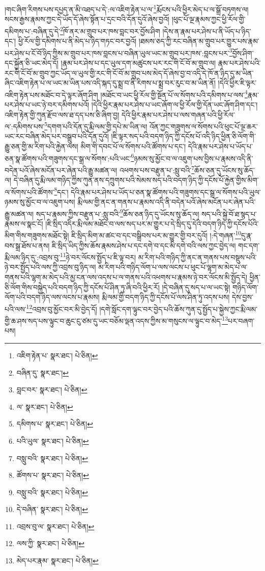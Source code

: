 །གང་ཞིག་རིགས་པས་དཔྱད་ན་མི་འཐད་པ་དེ་:ལ་འཇིག་རྟེན་པ་ལ་\footnote{འཇིག་རྟེན་པ་  སྣར་ཐང་།  པེ་ཅིན། }རྨོངས་པའི་ཕྱིར་མེད་པ་ལ་སྒྲོ་བཏགས་ལ། སངས་རྒྱས་རྣམས་ཀྱང་དེ་ཡོད་དོ་ཞེས་སྟོན་པ་དྲང་བའི་དོན་དུའོ་ཞེས་བྱའོ། །ཕུང་པོ་ལྔ་རྣམས་ཀྱང་ཕྱི་རོལ་གྱི་དམིགས་པ་:བཞིན་དུ་དེ་\footnote{བཞིན་དུ་  སྣར་ཐང་། }ཁོ་ནར་མ་གྲུབ་པར་ཁས་བླང་བར་བྱོས་ཤིག །དེས་ན་རྣམ་པར་ཤེས་པ་ནི་ཡོད་པ་ཉིད་དང་། ཕྱི་རོལ་གྱི་དམིགས་པ་ནི་མེད་པ་ཉིད་གཏང་བར་བྱའོ། །ཐམས་ཅད་ཀྱི་རང་བཞིན་མ་གྲུབ་པར་གྱུར་པས་རྣམ་པར་ཤེས་པ་ངོ་བོ་ཉིད་ཀྱིས་མ་གྲུབ་པར་ཁས་བླངས་པ་བཞིན་ཡུལ་ཡང་མ་གྲུབ་པར་ཁས་:བླངས་པར་\footnote{བླང་བར་  སྣར་ཐང་།  པེ་ཅིན། }བྱོས་ཤིག་དང་སྐྱོན་ཅི་ཡང་མེད་དོ། །རྣམ་པར་ཤེས་པ་དང་ཡུལ་དག་མཚུངས་པར་རང་གི་ངོ་བོ་མ་གྲུབ་ལ། རྣམ་པར་ཤེས་པའི་རང་གི་ངོ་བོ་མ་གྲུབ་ཀྱང་ཡོད་ལ་ཡུལ་གྱི་རང་གི་ངོ་བོ་མ་གྲུབ་པས་མེད་དོ་ཞེས་བྱ་བ་འདི་དེ་ཁོ་ན་ཉིད་དུ་མ་ཡིན་ཞིང་འཇིག་རྟེན་པ་ལ་ཡང་མ་ཡིན་པས་འདི་སྐད་དུ་སྨྲ་བ་ནི་རིགས་པ་སྨྲ་བར་རུང་བ་མ་ཡིན་ནོ། །དེའི་ཕྱིར་ཇི་ལྟར་འཇིག་རྟེན་པས་མཐོང་བ་དེ་ལྟར་ཞོག་ཤིག །མཐོང་བ་ཡང་ཕྱི་རོལ་གྱི་སྔོན་པོ་ལ་སོགས་པའི་དམིགས་པ་ལས་\footnote{ལ་  སྣར་ཐང་།  པེ་ཅིན། }རྣམ་པར་ཤེས་པ་ཡང་ཉེ་བར་དམིགས་པའོ། །དེའི་ཕྱིར་རྣམ་པར་ཤེས་པ་ཡང་ཞོག་ལ་ཕྱི་རོལ་གྱི་དོན་ཡང་ཞོག་ཤིག་དང་། འཇིག་རྟེན་གྱི་ཀུན་རྫོབ་ལས་ཐ་དད་པས་ཅི་ཞིག་བྱ། དེའི་ཕྱིར་རྣམ་པར་ཤེས་པ་ལས་གཞན་པའི་ཕྱི་རོལ་ལ་:དམིགས་པས་\footnote{དམིགས་པ་  སྣར་ཐང་།  པེ་ཅིན། }དགག་པའི་དོན་དུ་རྨི་ལམ་གྱི་དཔེ་མ་ཡིན་ལ། འོན་ཀྱང་གཟུགས་ལ་སོགས་པའི་ཕུང་པོ་ལྔ་ཆར་ཡང་རང་བཞིན་མེད་པར་བསྒྲུབ་པའི་དོན་དུའོ། །ཇི་ལྟར་སད་པའི་བདག་ཉིད་ཀྱི་དངོས་པོ་འདི་ཉིད་ཕྱིན་ཅི་ལོག་གི་རྒྱུ་ཅན་གྱི་མ་རིག་པའི་རྐྱེན་ལས། མིག་གི་དབང་པོ་ལ་སོགས་པའི་ཚོགས་པ་དང་། དེའི་རྣམ་པར་ཤེས་པ་ཡོད་པ་ཅན་སྣ་ཚོགས་པའི་གཟུགས་དང་སྒྲ་ལ་སོགས་:པའི་ཡང་\footnote{པའི་ཡུལ་  སྣར་ཐང་།  པེ་ཅིན། }ཉམས་སུ་མྱོང་བ་ལ་འཇུག་པས་བྱིས་པ་རྣམས་འདི་ནི་བདེན་པའོ་ཞེས་མངོན་པར་ཞེན་པའི་རྒྱུ་མཚན་ལ། འཕགས་པས་བརྫུན་པ་:སླུ་བའི་\footnote{བསླུ་བའི་  སྣར་ཐང་།  པེ་ཅིན། }ཆོས་ཅན་དུ་ཡོངས་སུ་ཆོད་ལ། དེ་བཞིན་དུ་རྨི་ལམ་གཉིད་ཀྱིས་ཀུན་ནས་དཀྲུགས་པའི་སེམས་སད་པའི་བདག་ཉིད་ཀྱི་དངོས་པོ་རྐྱེན་གྱིས་མིག་ལ་སོགས་པའི་ཚོགས་\footnote{ཚོགས་པ་  སྣར་ཐང་།  པེ་ཅིན། }དང་། དེའི་རྣམ་པར་ཤེས་པ་ཡོད་པ་ཅན་སྣ་ཚོགས་པའི་གཟུགས་དང་སྒྲ་ལ་སོགས་པའི་ཡུལ་ཉམས་སུ་མྱོང་བ་ལ་འཇུག་པས། རྨི་ལམ་གྱི་ནང་ན་གནས་པ་རྣམས་འདི་ནི་བདེན་པའོ་ཞེས་མངོན་པར་ཞེན་པའི་རྒྱུ་མཚན་ལ། སད་པ་རྣམས་ཀྱིས་བརྫུན་པ་:སླུ་བའི་\footnote{བསླུ་བའི་  སྣར་ཐང་།  པེ་ཅིན། }ཆོས་ཅན་ཉིད་དུ་ཡོངས་སུ་ཆོད་ལ། སད་པའི་སྐྱེ་བོ་ཐ་སྙད་པ་རྣམས་ལ་སྣང་ངོ། །ཇི་སྲིད་འདིར་རྨི་ལམ་མཐོང་བ་ལས་སད་པར་མ་གྱུར་པ་དེ་སྲིད་དུ་དེའི་བདག་ཉིད་ཀྱི་དངོས་པོའི་མིག་གིས་གཟུགས་མཐོང་སྟེ། ཇི་སྲིད་མིག་མ་ཚང་བ་དང་བསྒྲིབས་པར་མ་གྱུར་གྱི་བར་དུའོ། །:དེ་གཞན་\footnote{དེ་བཞིན་  སྣར་ཐང་།  པེ་ཅིན། }དུ་རྣ་བས་སྒྲ་ཐོས་པ་ནས། ཇི་སྲིད་ཡིད་ཀྱིས་ཆོས་རྣམས་ཤེས་པ་དང་དགེ་བ་དང་མི་དགེ་བའི་ལས་ཀྱང་བྱེད་ལ། གང་དག་རྨི་ལམ་ཉིད་དུ་:འབྲས་བུ་\footnote{འབྲས་བུ་ལ་  སྣར་ཐང་།  པེ་ཅིན། }ཉེ་བར་ལོངས་སྤྱོད་པ་ཇི་ལྟ་བར། མ་རིག་པའི་གཉིད་ཀྱི་ནང་ན་གནས་པས་བསྡུས་པའི་ཉེ་བར་སྤྱོད་པའི་ལས་ཀྱི་འབྲས་བུ་ཉིད་ལ། མ་རིག་པའི་གཉིད་ལོག་པ་ལས་ལངས་པ་ཕུང་པོ་ལྷག་མ་མེད་པ་ལ་གནས་པའི་ལྷག་མ་མེད་པའི་མྱ་ངན་ལས་འདས་པ་ལ་གནས་པའི་འཕགས་པ་རྣམས་ཉེ་བར་ལོངས་མི་སྤྱོད་དེ། ཕྱིན་ཅི་ལོག་གིས་བསྐྱེད་པའི་བདག་ཉིད་ཀྱི་དངོས་པོ་ཤིན་ཏུ་ཞི་བའི་ཕྱིར་རོ། །དེ་བཞིན་དུ་སད་པ་ལ་ཡང་སྟེ། གཉིད་ལོག་ལོག་པའི་བདག་ཉིད་ལས་ལངས་པ་རྣམས། རྨི་ལམ་གྱི་བདག་ཉིད་ཀྱི་དངོས་པོ་ལས་ཤིན་ཏུ་འདས་པས། དེས་བྱས་པའི་ལས་\footnote{ལས་ཀྱི་  སྣར་ཐང་།  པེ་ཅིན། }འབྲས་བུ་མྱོང་བར་མི་བྱེད་དོ། །དགེ་སློང་དག་ལྟུང་བར་བྱེད་པའི་ཆོས་ཀུན་དུ་སྤྱོད་པ་སྐྱེས་ཀྱང་རྨི་ལམ་གྱི་ཆ་ཤས་སད་པས་ལྟུང་བ་ཆུང་ངུ་ཙམ་དུ་ཡང་བཅོམ་ལྡན་འདས་ཀྱིས་མ་གསུངས་ལ་ལྟུང་བ་མེད་\footnote{མེད་པར་རྣམ་  སྣར་ཐང་།  པེ་ཅིན། }པར་བཞག་པས། 
